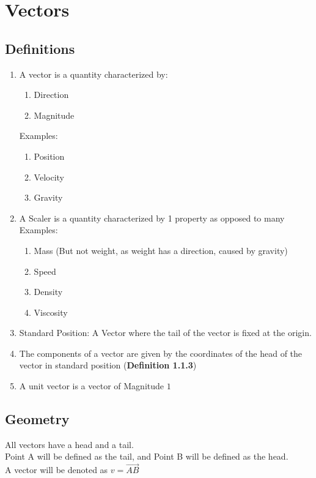 \documentclass[]{article}
\title{\docTitle}
\author{\docAuthor}
\date{\today}
\begin{document}
\maketitle

\section{Vectors}
\subsection{Definitions}
    \begin{enumerate}
        \item A vector is a quantity characterized by:
        \begin{enumerate}
            \item Direction
            \item Magnitude
        \end{enumerate}
        Examples:
        \begin{enumerate}
            \item Position
            \item Velocity
            \item Gravity
        \end{enumerate}
        \item A Scaler is a quantity characterized by 1 property as opposed to many\\
        Examples:
        \begin{enumerate}
            \item Mass (But not weight, as weight has a direction, caused by gravity)
            \item Speed
            \item Density
            \item Viscosity
        \end{enumerate}
        \item Standard Position: A Vector where the tail of the vector is fixed at the origin.
        \item The components of a vector are given by the coordinates of the head of the vector in standard position (\textbf{Definition 1.1.3})
        \item A unit vector is a vector of Magnitude $1$
    \end{enumerate}

    \subsection*{Geometry}
    All vectors have a head and a tail. \\
    Point A will be defined as the tail, and Point B will be defined as the head.\\
    A vector will be denoted as $v=\overrightarrow{AB}$\\
\end{document}
